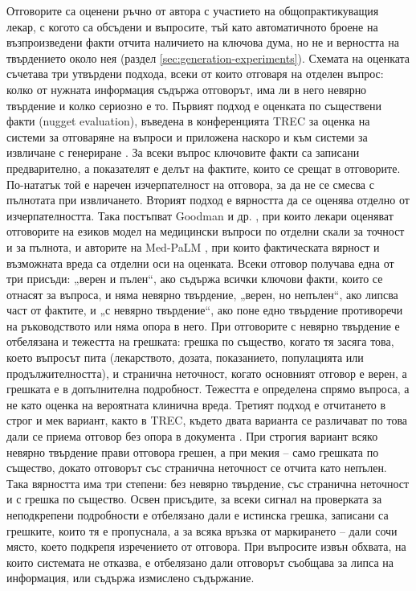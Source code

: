 \documentclass[12pt,a4paper]{article}
\makeatletter
\renewcommand\paragraph{\@startsection{paragraph}{4}{\z@}{1.5ex \@plus .5ex \@minus .2ex}{-1em}{\normalfont\normalsize\bfseries}}
\makeatother
\begin{document}
\paragraph{Оценка на отговорите.} Отговорите са оценени ръчно от автора с участието на общопрактикуващия лекар, с когото са обсъдени и въпросите, тъй като автоматичното броене на възпроизведени факти отчита наличието на ключова дума, но не и верността на твърдението около нея (раздел \ref{sec:generation-experiments}). Схемата на оценката съчетава три утвърдени подхода, всеки от които отговаря на отделен въпрос: колко от нужната информация съдържа отговорът, има ли в него невярно твърдение и колко сериозно е то. Първият подход е оценката по съществени факти (nugget evaluation), въведена в конференцията TREC за оценка на системи за отговаряне на въпроси \cite{voorhees2003trecqa} и приложена наскоро и към системи за извличане с генериране \cite{pradeep2024nuggets}. За всеки въпрос ключовите факти са записани предварително, а показателят е делът на фактите, които се срещат в отговорите. По-нататък той е наречен изчерпателност на отговора, за да не се смесва с пълнотата при извличането. Вторият подход е вярността да се оценява отделно от изчерпателността. Така постъпват Goodman и др. \cite{goodman2023chatbot}, при които лекари оценяват отговорите на езиков модел на медицински въпроси по отделни скали за точност и за пълнота, и авторите на Med-PaLM \cite{singhal2023medpalm}, при които фактическата вярност и възможната вреда са отделни оси на оценката. Всеки отговор получава една от три присъди: „верен и пълен“, ако съдържа всички ключови факти, които се отнасят за въпроса, и няма невярно твърдение, „верен, но непълен“, ако липсва част от фактите, и „с невярно твърдение“, ако поне едно твърдение противоречи на ръководството или няма опора в него. При отговорите с невярно твърдение е отбелязана и тежестта на грешката: грешка по същество, когато тя засяга това, което въпросът пита (лекарството, дозата, показанието, популацията или продължителността), и странична неточност, когато основният отговор е верен, а грешката е в допълнителна подробност. Тежестта е определена спрямо въпроса, а не като оценка на вероятната клинична вреда. Третият подход е отчитането в строг и мек вариант, както в TREC, където двата варианта се различават по това дали се приема отговор без опора в документа \cite{voorhees2000trec9qa}. При строгия вариант всяко невярно твърдение прави отговора грешен, а при мекия -- само грешката по същество, докато отговорът със странична неточност се отчита като непълен. Така вярността има три степени: без невярно твърдение, със странична неточност и с грешка по същество. Освен присъдите, за всеки сигнал на проверката за неподкрепени подробности е отбелязано дали е истинска грешка, записани са грешките, които тя е пропуснала, а за всяка връзка от маркирането -- дали сочи място, което подкрепя изречението от отговора. При въпросите извън обхвата, на които системата не отказва, е отбелязано дали отговорът съобщава за липса на информация, или съдържа измислено съдържание.
\end{document}

